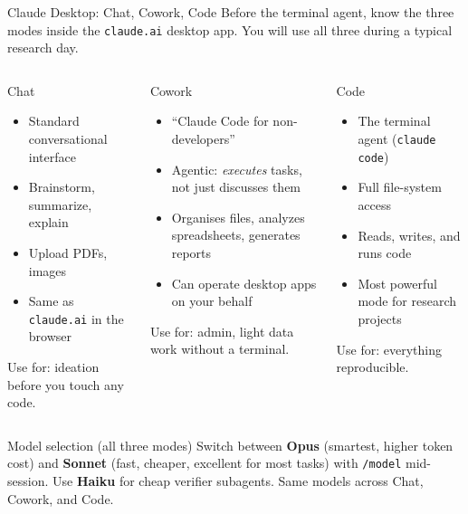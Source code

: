 \documentclass[aspectratio=169,10pt]{beamer}
\newcommand{\emphc}[1]{\textcolor{harvardcrimson}{#1}}
\begin{document}
\begin{frame}{Claude Desktop: Chat, Cowork, Code}
\small
Before the terminal agent, know the three modes inside the \texttt{claude.ai}
desktop app. You will use all three during a typical research day.

\vspace{0.4em}
\begin{columns}[T]
\begin{block}{\centering Chat}
\scriptsize
\begin{itemize}\itemsep1pt
  \item Standard conversational interface
  \item Brainstorm, summarize, explain
  \item Upload PDFs, images
  \item Same as \texttt{claude.ai} in the browser
\end{itemize}
\vspace{0.2em}
\emphc{Use for:} ideation before you touch any code.
\end{block}

\begin{block}{\centering Cowork}
\scriptsize
\begin{itemize}\itemsep1pt
  \item ``Claude Code for non-developers''
  \item Agentic: \emph{executes} tasks, not just discusses them
  \item Organises files, analyzes spreadsheets, generates reports
  \item Can operate desktop apps on your behalf
\end{itemize}
\vspace{0.2em}
\emphc{Use for:} admin, light data work without a terminal.
\end{block}

\begin{block}{\centering Code}
\scriptsize
\begin{itemize}\itemsep1pt
  \item The terminal agent (\texttt{claude code})
  \item Full file-system access
  \item Reads, writes, and runs code
  \item Most powerful mode for research projects
\end{itemize}
\vspace{0.2em}
\emphc{Use for:} everything reproducible.
\end{block}
\end{columns}

\vspace{0.4em}
\begin{alertblock}{Model selection (all three modes)}
\scriptsize
Switch between \textbf{Opus} (smartest, higher token cost) and \textbf{Sonnet}
(fast, cheaper, excellent for most tasks) with \texttt{/model} mid-session.
Use \textbf{Haiku} for cheap verifier subagents. Same models across Chat,
Cowork, and Code.
\end{alertblock}
\end{frame}
\end{document}

